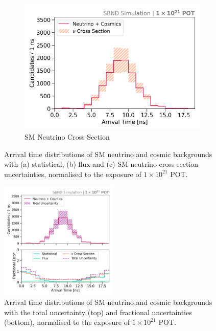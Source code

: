 \begin{figure}[htbp!]
\begin{subfigure}[b]{0.45\textwidth}
            \includegraphics[width=\textwidth]{bkg_xsec_error}
            \caption{SM Neutrino Cross Section}%
            \label{fig:bkg_xsec}
        \end{subfigure}
	\caption[Uncertainties of SM Neutrinos and Cosmic Backgrounds]{
		Arrival time distributions of SM neutrino and cosmic backgrounds with (a) statistical, (b) flux and (c) SM neutrino cross section uncertainties, normalised to the exposure of $1 \times 10^{21}$ POT.
	}
        \label{fig:bkg_error}
\vspace{0.15cm}
\centering    
\includegraphics[width=0.5\textwidth]{bkg_error}
\caption[Total Uncertainty and Fractional Uncertainties of SM Neutrinos and Cosmic Backgrounds]{
Arrival time distributions of SM neutrino and cosmic backgrounds with the total uncertainty (top) and fractional uncertainties (bottom), normalised to the exposure of $1 \times 10^{21}$ POT.
}
\label{fig:bkg_total_error}
\end{figure}

